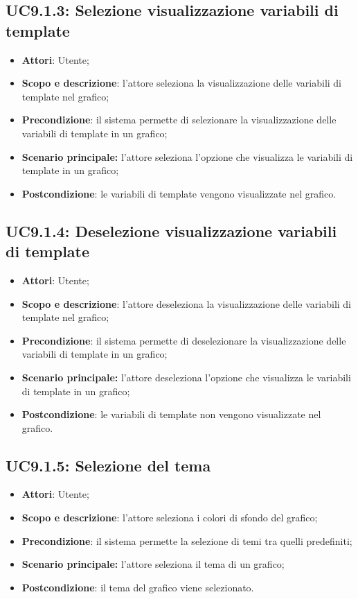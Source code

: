 \subsection{UC9.1.3: Selezione visualizzazione variabili di template}
\hypertarget{UC8.1.3}{}
\begin{itemize}
	\item \textbf{Attori}: Utente;
	\item \textbf{Scopo e descrizione}: l'attore seleziona la visualizzazione delle variabili di template nel grafico;
	\item \textbf{Precondizione}: il sistema permette di selezionare la visualizzazione delle variabili di template in un grafico;
	\item \textbf{Scenario principale:} l'attore seleziona l'opzione che visualizza le variabili di template in un grafico;
	\item \textbf{Postcondizione}: le variabili di template vengono visualizzate nel grafico.
\end{itemize}

\subsection{UC9.1.4: Deselezione visualizzazione variabili di template}
\hypertarget{UC8.1.4}{}
\begin{itemize}
	\item \textbf{Attori}: Utente;
	\item \textbf{Scopo e descrizione}: l'attore deseleziona la visualizzazione delle variabili di template nel grafico;
	\item \textbf{Precondizione}: il sistema permette di deselezionare la visualizzazione delle variabili di template in un grafico;
	\item \textbf{Scenario principale:} l'attore deseleziona l'opzione che visualizza le variabili di template in un grafico;
	\item \textbf{Postcondizione}: le variabili di template non vengono visualizzate nel grafico.
\end{itemize}

\subsection{UC9.1.5: Selezione del tema}
\hypertarget{UC8.1.5}{}
\begin{itemize}
	\item \textbf{Attori}: Utente;
	\item \textbf{Scopo e descrizione}: l'attore seleziona i colori di sfondo del grafico; 
	\item \textbf{Precondizione}: il sistema permette la selezione di temi tra quelli predefiniti;
	\item \textbf{Scenario principale:} l'attore seleziona il tema di un grafico;
	\item \textbf{Postcondizione}: il tema del grafico viene selezionato.
\end{itemize}

